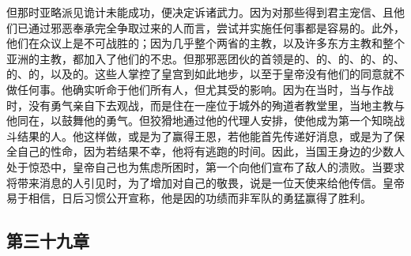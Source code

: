 但那时亚略派见诡计未能成功，便决定诉诸武力。因为对那些得到君主宠信、且他们已通过邪恶奉承完全争取过来的人而言，尝试并实施任何事都是容易的。此外，他们在众议上是不可战胜的；因为几乎整个两省的主教，以及许多东方主教和整个亚洲的主教，都加入了他们的不忠。但那邪恶团伙的首领是的、的、的、的、的、的、的，以及的。这些人掌控了皇宫到如此地步，以至于皇帝没有他们的同意就不做任何事。他确实听命于他们所有人，但尤其受的影响。因为在当时，当与作战时，没有勇气亲自下去观战，而是住在一座位于城外的殉道者教堂里，当地主教与他同在，以鼓舞他的勇气。但狡猾地通过他的代理人安排，使他成为第一个知晓战斗结果的人。他这样做，或是为了赢得王恩，若他能首先传递好消息，或是为了保全自己的性命，因为若结果不幸，他将有逃跑的时间。因此，当国王身边的少数人处于惊恐中，皇帝自己也为焦虑所困时，第一个向他们宣布了敌人的溃败。当要求将带来消息的人引见时，为了增加对自己的敬畏，说是一位天使来给他传信。皇帝易于相信，日后习惯公开宣称，他是因的功绩而非军队的勇猛赢得了胜利。\par


\subsection{第三十九章}

